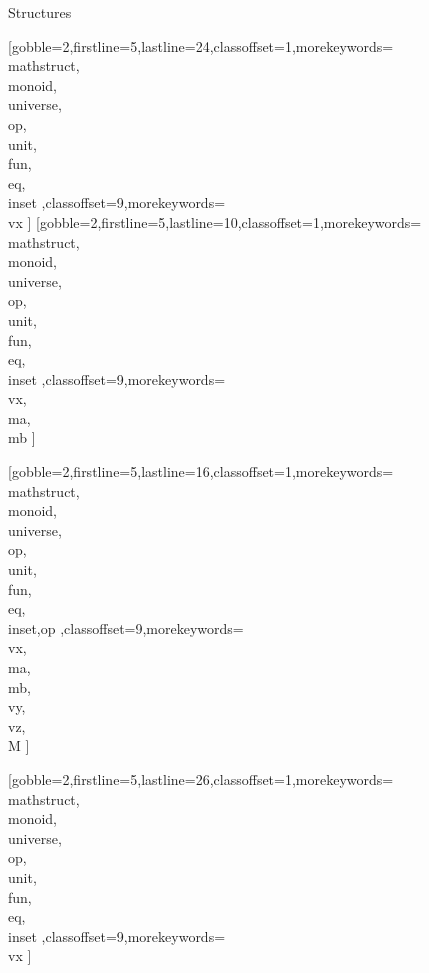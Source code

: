 \documentclass[lang={en,de}]{stex}
\begin{document}
  \begin{sfragment}[id=tutorial:structures]{Structures}


    [gobble=2,firstline=5,lastline=24,classoffset=1,morekeywords={
    \\mathstruct,\\monoid,\\universe,\\op,\\unit,\\fun,\\eq,\\inset
    },classoffset=9,morekeywords={
      \\vx
    }]
    [gobble=2,firstline=5,lastline=10,classoffset=1,morekeywords={
    \\mathstruct,\\monoid,\\universe,\\op,\\unit,\\fun,\\eq,\\inset
    },classoffset=9,morekeywords={
      \\vx,\\ma,\\mb
    }]

    [gobble=2,firstline=5,lastline=16,classoffset=1,morekeywords={
    \\mathstruct,\\monoid,\\universe,\\op,\\unit,\\fun,\\eq,\\inset,op
    },classoffset=9,morekeywords={
      \\vx,\\ma,\\mb,\\vy,\\vz,\\M
    }]

    [gobble=2,firstline=5,lastline=26,classoffset=1,morekeywords={
    \\mathstruct,\\monoid,\\universe,\\op,\\unit,\\fun,\\eq,\\inset
    },classoffset=9,morekeywords={
      \\vx
    }]

  \end{sfragment}
\end{document}

